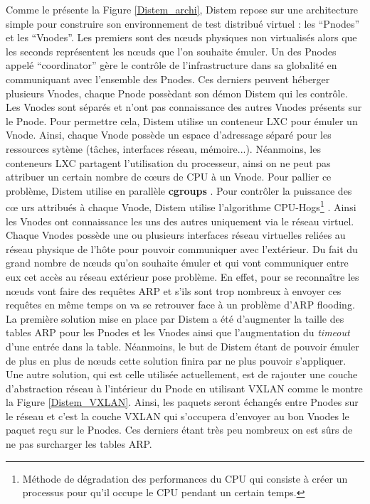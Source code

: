 Comme le présente la Figure \ref{Distem_archi}, Distem repose sur une
architecture simple pour construire son environnement de test distribué virtuel
: les ``Pnodes'' et les ``Vnodes''. Les premiers sont des n\oe uds physiques non
virtualisés alors que les seconds représentent les n\oe uds que l'on souhaite
émuler. Un des Pnodes appelé ``coordinator'' gère le contrôle de
l'infrastructure dans sa globalité en communiquant avec l'ensemble des
Pnodes. Ces derniers peuvent héberger plusieurs Vnodes, chaque Pnode possèdant
son démon Distem qui les contrôle. Les Vnodes sont séparés et n'ont pas
connaissance des autres Vnodes présents sur le Pnode. Pour permettre cela,
Distem utilise un conteneur LXC pour émuler un Vnode. Ainsi, chaque Vnode
possède un espace d'adressage séparé pour les ressources sytème (tâches,
interfaces réseau, mémoire...). Néanmoins, les conteneurs LXC partagent
l'utilisation du processeur, ainsi on ne peut pas attribuer un certain nombre de
c\oe urs de CPU à un Vnode. Pour pallier ce problème, Distem utilise en
parallèle \textbf{cgroups} \citep{cgroups}. Pour contrôler la puissance des c\oe
urs attribués à chaque Vnode, Distem utilise l'algorithme
CPU-Hogs\footnote{Méthode de dégradation des performances du CPU qui consiste à
  créer un processus pour qu'il occupe le CPU pendant un certain temps.}
\citep{DISTEM_buchert2011methods}. Ainsi les Vnodes ont connaissance les uns des
autres uniquement via le réseau virtuel. Chaque Vnodes possède une ou plusieurs
interfaces réseau virtuelles reliées au réseau physique de l'hôte pour pouvoir
communiquer avec l'extérieur. Du fait du grand nombre de n\oe uds qu'on souhaite
émuler et qui vont communiquer entre eux cet accès au réseau extérieur pose
problème. En effet, pour se reconnaître les n\oe uds vont faire des requêtes ARP
et s'ils sont trop nombreux à envoyer ces requêtes en même temps on va se
retrouver face à un problème d'ARP flooding. La première solution mise en place
par Distem a été d'augmenter la taille des tables ARP pour les Pnodes et les
Vnodes ainsi que l'augmentation du \textit{timeout} d'une entrée dans la
table. Néanmoins, le but de Distem étant de pouvoir émuler de plus en plus de
n\oe uds cette solution finira par ne plus pouvoir s'appliquer. Une autre
solution, qui est celle utilisée actuellement, est de rajouter une couche
d'abstraction réseau à l'intérieur du Pnode en utilisant
VXLAN\citep{VXLAN_mahalingam2014virtual, DISTEM_buchert2014emulation} comme le
montre la Figure \ref{Distem_VXLAN}. Ainsi, les paquets seront échangés entre
Pnodes sur le réseau et c'est la couche VXLAN qui s'occupera d'envoyer au bon
Vnodes le paquet reçu sur le Pnodes. Ces derniers étant très peu nombreux on est
sûrs de ne pas surcharger les tables ARP.

